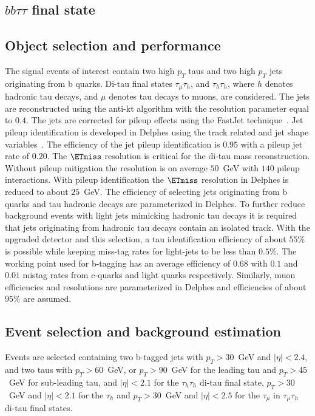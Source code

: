 \subsection{$bb\tau\tau$ final state}

\subsection{Object selection and performance}
The signal events of interest contain two high $p_{T}$ taus and two high $p_{T}$ jets originating from b quarks. Di-tau final states $\tau_{\mu}\tau_{h}$, and $\tau_{h}\tau_{h}$, where $h$ denotes hadronic tau decays, and $\mu$ denotes tau decays to muons, are considered.
The jets are reconstructed using the anti-kt algorithm with the resolution parameter equal to $0.4$. The jets are corrected for pileup effects using the FastJet technique~\cite{CMS-PAS-JME-10-003,CMS-PAS-BTV-13-001,CMS-DP-2013-011}. Jet pileup identification is developed in Delphes using the track related and jet shape variables~\cite{CMS-PAS-JME-10-003}. The efficiency of the jet pileup identification is $0.95$ with a pileup jet rate of $0.20$. The $\ETmiss$ resolution is critical for the di-tau mass reconstruction. Without pileup mitigation the resolution is on average $50$~GeV with $140$ pileup interactions. With pileup identification the  $\ETmiss$ resolution in Delphes is reduced to about $25$~GeV. 
The efficiency of selecting jets originating from b quarks and tau hadronic decays are parameterized in Delphes. To further reduce background events with light jets mimicking hadronic
tau decays it is required that jets originating from hadronic tau decays contain an isolated track. With the upgraded \phasetwo detector and this selection, a tau identification efficiency of about $55\%$ is possible while keeping miss-tag rates for light-jets to be less than $0.5\%$. The working point used for b-tagging has an average efficiency of $0.68$ with $0.1$ and $0.01$ mistag rates from c-quarks and light quarks respectively.  Similarly, muon efficiencies and resolutions are parameterized in Delphes and efficiencies of about $95\%$ are assumed.

\subsection{Event selection and background estimation}
Events are selected containing two b-tagged jets with $p_{T}>30$~GeV
and $|\eta|<2.4$, and two taus with $p_{T}>60$~GeV, or $p_{T}>90$~GeV
for the leading tau and $p_{T}>45$~GeV for sub-leading tau, and
$|\eta|<2.1$ for the $\tau_{h}\tau_{h}$ di-tau final state, $p_{T}>30$~GeV
and $|\eta|<2.1$  for the $\tau_{h}$ and $p_{T}>30$~GeV and $|\eta|<2.5$
for the $\tau_{\mu}$ in $\tau_{\mu}\tau_{h}$ di-tau final states. 

